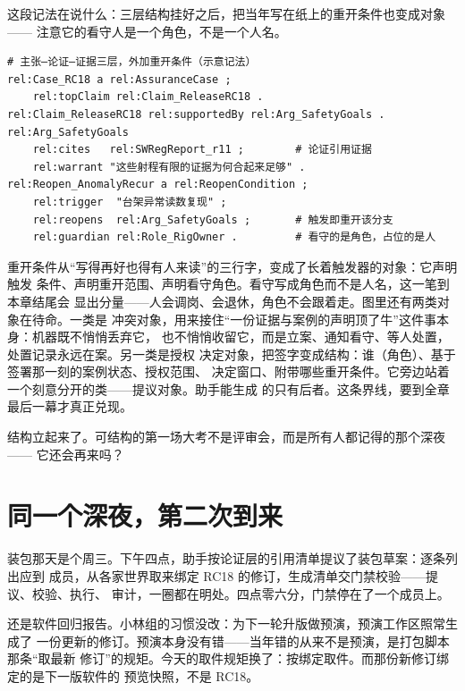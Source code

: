 这段记法在说什么：三层结构挂好之后，把当年写在纸上的重开条件也变成对象——
注意它的看守人是一个角色，不是一个人名。

\nopagebreak[4]
\begin{codebox}
\begin{Verbatim}[fontsize=\small,breaklines=true,breakanywhere=true,breaksymbolleft={},breaksymbolright={}]
# 主张—论证—证据三层，外加重开条件（示意记法）
rel:Case_RC18 a rel:AssuranceCase ;
    rel:topClaim rel:Claim_ReleaseRC18 .
rel:Claim_ReleaseRC18 rel:supportedBy rel:Arg_SafetyGoals .
rel:Arg_SafetyGoals
    rel:cites   rel:SWRegReport_r11 ;        # 论证引用证据
    rel:warrant "这些射程有限的证据为何合起来足够" .
rel:Reopen_AnomalyRecur a rel:ReopenCondition ;
    rel:trigger  "台架异常读数复现" ;
    rel:reopens  rel:Arg_SafetyGoals ;       # 触发即重开该分支
    rel:guardian rel:Role_RigOwner .         # 看守的是角色，占位的是人
\end{Verbatim}
\end{codebox}

重开条件从“写得再好也得有人来读”的三行字，变成了长着触发器的对象：它声明触发
条件、声明重开范围、声明看守角色。看守写成角色而不是人名，这一笔到本章结尾会
显出分量——人会调岗、会退休，角色不会跟着走。图里还有两类对象在待命。一类是
冲突对象，用来接住“一份证据与案例的声明顶了牛”这件事本身：机器既不悄悄丢弃它，
也不悄悄收留它，而是立案、通知看守、等人处置，处置记录永远在案。另一类是授权
决定对象，把签字变成结构：谁（角色）、基于签署那一刻的案例状态、授权范围、
决定窗口、附带哪些重开条件。它旁边站着一个刻意分开的类——提议对象。助手能生成
的只有后者。这条界线，要到全章最后一幕才真正兑现。

结构立起来了。可结构的第一场大考不是评审会，而是所有人都记得的那个深夜——
它还会再来吗？

\section{同一个深夜，第二次到来}

装包那天是个周三。下午四点，助手按论证层的引用清单提议了装包草案：逐条列出应到
成员，从各家世界取来绑定 RC18 的修订，生成清单交门禁校验——提议、校验、执行、
审计，一圈都在明处。四点零六分，门禁停在了一个成员上。

还是软件回归报告。小林组的习惯没改：为下一轮升版做预演，预演工作区照常生成了
一份更新的修订。预演本身没有错——当年错的从来不是预演，是打包脚本那条“取最新
修订”的规矩。今天的取件规矩换了：按绑定取件。而那份新修订绑定的是下一版软件的
预览快照，不是 RC18。

